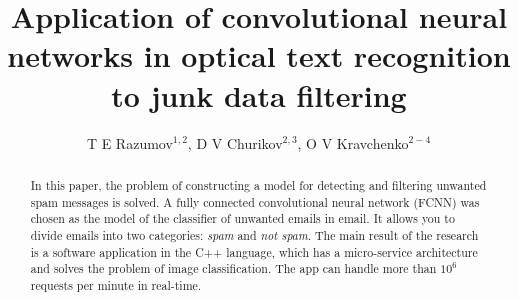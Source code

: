 \documentclass[12pt]{jpconf}
\begin{document}
\title{Application of convolutional neural networks in optical text recognition to junk data filtering}
\author{T E Razumov$^{1,2}$, D V Churikov$^{2,3}$, O V Kravchenko$^{2-4}$}

\address{
$^1$\,Mail.ru Group, Leningradsky pr., 39--79, Moscow, 125167, Russian Federation\\
$^2$\,Scientific and Technological Centre of Unique Instrumentation, Butlerova str., 15, Moscow, 117342, Russian Federation\\
$^3$\,Kotel'nikov Institute of Radio Engineering and Electronics of RAS, Mokhovaya st. 11--7,
Moscow, 125009, Russian Federation\\
$^4$\,Federal Research Center ``Computer Science and Control'' of RAS, Vavilova st., 40, Moscow, 119333, Russian Federation
}



\begin{abstract}
In this paper, the problem of constructing a model for detecting and filtering unwanted spam messages is solved. A fully connected convolutional neural network ({FCNN}) was chosen as the model of the classifier of unwanted emails in email. It allows you to divide emails into two categories: \emph{spam} and \emph{not spam}.
The main result of the research is a software application in the \textsf{C++} language, which has a micro-service architecture and solves the problem of image classification. The app can handle more than $10^6$ requests per minute in real-time.
\end{abstract}

\end{document}
